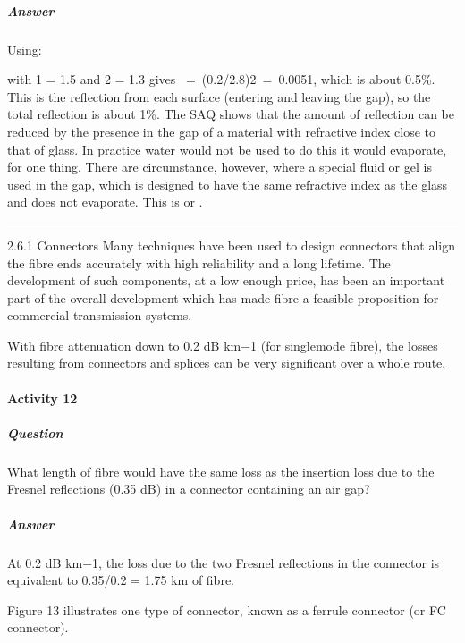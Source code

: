 \documentclass[letterpaper,10pt,english]{sphinxmanual}
\let\sphinxpxdimen\pdfpxdimen\else\newdimen\sphinxpxdimen
\begin{document}
\subparagraph{Answer}
\label{\detokenize{content/session_00/Part_00_02:id34}}
Using:

\sphinxincludegraphics[width=511\sphinxpxdimen,height=287\sphinxpxdimen]{{t305_ue027i}.gif}

with 1 = 1.5 and 2 = 1.3 gives  = (0.2/2.8){}2 = 0.0051, which is about 0.5\%. This is the reflection from each surface (entering and leaving the gap), so the total reflection is about 1\%. The SAQ shows that the amount of reflection can be reduced by the presence in the gap of a material with refractive index close to that of glass. In practice water would not be used to do this \textendash{} it would evaporate, for one thing. There are circumstance, however, where a special fluid or gel is used
in the gap, which is designed to have the same refractive index as the glass and does not evaporate. This is  or .


\bigskip\hrule\bigskip


2.6.1 Connectors Many techniques have been used to design connectors that align the fibre ends accurately with high reliability and a long lifetime. The development of such components, at a low enough price, has been an important part of the overall development which has made fibre a feasible proposition for commercial transmission systems.

With fibre attenuation down to 0.2 dB km−1 (for single\sphinxhyphen{}mode fibre), the losses resulting from connectors and splices can be very significant over a whole route.


\paragraph{Activity 12}
\label{\detokenize{content/session_00/Part_00_02:Activity-12}}

\subparagraph{Question}
\label{\detokenize{content/session_00/Part_00_02:id35}}
What length of fibre would have the same loss as the insertion loss due to the Fresnel reflections (0.35 dB) in a connector containing an air gap?


\subparagraph{Answer}
\label{\detokenize{content/session_00/Part_00_02:id36}}
At 0.2 dB km−1, the loss due to the two Fresnel reflections in the connector is equivalent to 0.35/0.2 = 1.75 km of fibre.

Figure 13 illustrates one type of connector, known as a ferrule connector (or FC connector).
\end{document}
